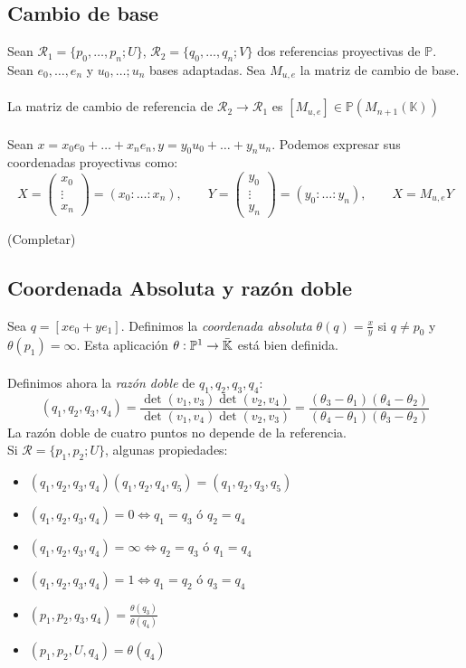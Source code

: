 \documentclass{myclass}
\newcommand{\K}{\mathbb{K}}
\renewcommand{\P}{\mathbb{P}}
\newcommand{\Rcal}{\mathcal{R}}
\begin{document}
\subsection{Cambio de base}
Sean $\Rcal_1 = \{p_0, \ldots, p_n; U\}$, $\Rcal_2 = \{q_0, \ldots, q_n; V\}$ dos referencias proyectivas de $\P$. Sean $e_0, \ldots, e_n$ y $u_0, \ldots;u_n$ bases adaptadas. Sea $M_{u,e}$ la matriz de cambio de base. \\
\\
La matriz de cambio de referencia de $\Rcal_2\to \Rcal_1$ es $[M_{u, e}]\in \P(M_{n+1}(\mathbb{K}))$\\
\\
Sean $x = x_0e_0 + \ldots + x_ne_n, y = y_0u_0 + \ldots + y_nu_n$. Podemos expresar sus coordenadas proyectivas como:
$$
X = \begin{pmatrix} x_0 \\ \vdots \\ x_n \end{pmatrix} = (x_0:\ldots:x_n) , \qquad Y = \begin{pmatrix} y_0 \\ \vdots \\ y_n \end{pmatrix} = (y_0:\ldots:y_n), \qquad X = M_{u, e}Y
$$

(Completar)

\subsection{Coordenada Absoluta y razón doble}
Sea $q = [xe_0 + ye_1]$. Definimos la \textit{coordenada absoluta} $\theta(q) = \frac{x}{y}$ si $q\neq p_0$ y $\theta(p_1) = \infty$. Esta aplicación $\theta :\P^1 \to \Bar{\K}$ está bien definida. \\
\\
Definimos ahora la \textit{razón doble} de $q_1, q_2, q_3, q_4$:
$$
(q_1, q_2, q_3, q_4) = \frac{\det(v_1, v_3) \det(v_2, v_4)}{\det(v_1, v_4) \det(v_2, v_3)} = \frac{(\theta_3 - \theta_1)(\theta_4-\theta_2)}{(\theta_4 - \theta_1)(\theta_3 - \theta_2)}
$$
La razón doble de cuatro puntos no depende de la referencia. \\
Si $\Rcal=\{p_1, p_2;U\}$, algunas propiedades:
\begin{itemize}
 \item $(q_1, q_2, q_3, q_4)(q_1, q_2, q_4, q_5) = (q_1, q_2, q_3, q_5)$
 \item $(q_1, q_2, q_3, q_4) = 0 \iff q_1 = q_3$ ó $q_2 = q_4$
 \item $(q_1, q_2, q_3, q_4) = \infty \iff q_2 = q_3$ ó $q_1 = q_4$
 \item $(q_1, q_2, q_3, q_4) = 1 \iff q_1 = q_2$ ó $q_3 = q_4$
 \item $(p_1, p_2, q_3, q_4)=\frac{\theta(q_3)}{\theta(q_4)}$  
 \item $(p_1, p_2, U, q_4)=\theta(q_4)$
\end{itemize}
\end{document}
